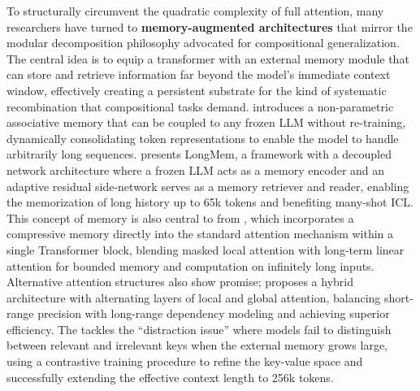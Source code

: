 \documentclass[11pt]{article}
\begin{document}
To structurally circumvent the quadratic complexity of full attention, many researchers have turned to \textbf{memory-augmented architectures} that mirror the modular decomposition philosophy advocated for compositional generalization. The central idea is to equip a transformer with an external memory module that can store and retrieve information far beyond the model's immediate context window, effectively creating a persistent substrate for the kind of systematic recombination that compositional tasks demand. \cite{ref624} introduces a non-parametric associative memory that can be coupled to any frozen LLM without re-training, dynamically consolidating token representations to enable the model to handle arbitrarily long sequences. \cite{ref625} presents LongMem, a framework with a decoupled network architecture where a frozen LLM acts as a memory encoder and an adaptive residual side-network serves as a memory retriever and reader, enabling the memorization of long history up to 65k tokens and benefiting many-shot ICL. This concept of memory is also central to \cite{ref626} from \cite{ref627}, which incorporates a compressive memory directly into the standard attention mechanism within a single Transformer block, blending masked local attention with long-term linear attention for bounded memory and computation on infinitely long inputs. Alternative attention structures also show promise; \cite{ref628} proposes a hybrid architecture with alternating layers of local and global attention, balancing short-range precision with long-range dependency modeling and achieving superior efficiency. The \cite{ref629} tackles the ``distraction issue'' where models fail to distinguish between relevant and irrelevant keys when the external memory grows large, using a contrastive training procedure to refine the key-value space and successfully extending the effective context length to 256k tokens.
\end{document}
